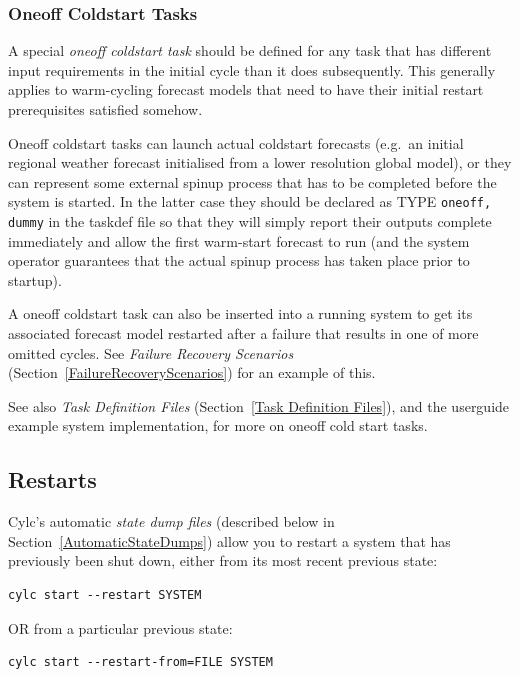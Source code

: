 \documentclass[11pt,a4paper]{article}
\begin{document}
\subsubsection{Oneoff Coldstart Tasks}

A special {\em oneoff coldstart task} should be defined for any task
that has different input requirements in the initial cycle than it does
subsequently. This generally applies to warm-cycling forecast models
that need to have their initial restart prerequisites satisfied somehow. 

Oneoff coldstart tasks can launch actual coldstart forecasts (e.g.\ an
initial regional weather forecast initialised from a lower resolution
global model), or they can represent some external spinup process that
has to be completed before the system is started. In the latter case
they should be declared as TYPE \lstinline=oneoff, dummy= in the taskdef
file so that they will simply report their outputs complete immediately
and allow the first warm-start forecast to run (and the system operator
guarantees that the actual spinup process has taken place prior to
startup).

A oneoff coldstart task can also be inserted into a running system to
get its associated forecast model restarted after a failure that results
in one of more omitted cycles. See {\em Failure Recovery Scenarios}
(Section~\ref{FailureRecoveryScenarios}) for an example of this. 

See also {\em Task Definition Files} (Section~\ref{Task Definition
Files}), and the userguide example system implementation, for more on
oneoff cold start tasks.

\subsection{Restarts}

Cylc's automatic {\em state dump files} (described below in
Section~\ref{AutomaticStateDumps}) allow you to restart a system
that has previously been shut down, either from 
its most recent previous state:

\begin{lstlisting}
cylc start --restart SYSTEM
\end{lstlisting}

OR from a particular previous state:

\begin{lstlisting}
cylc start --restart-from=FILE SYSTEM
\end{lstlisting}
\end{document}
